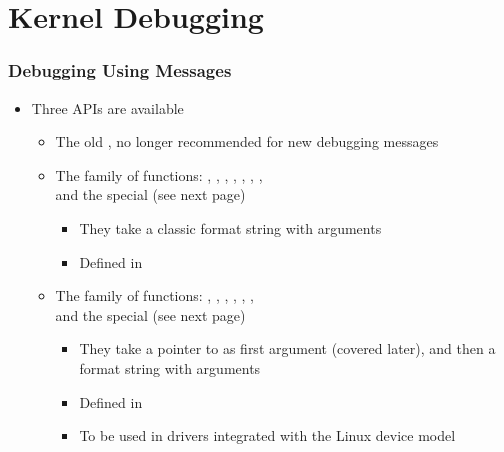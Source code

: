 \section{Kernel Debugging}

\begin{frame}
  \frametitle{Debugging Using Messages}
  \begin{itemize}
  \item Three APIs are available
    \begin{itemize}
    \item The old , no longer recommended for new debugging
      messages
    \item The  family of functions: ,
      , , ,
      , , ,
       \\
      and the special  (see next page)
      \begin{itemize}
      \item They take a classic format string with arguments
      \item Defined in 
      \end{itemize}
    \item The  family of functions: ,
      , , ,
      , ,  \\
      and the special  (see next page)
      \begin{itemize}
      \item They take a pointer to  as first
        argument (covered later), and then a format string with
        arguments
      \item Defined in 
      \item To be used in drivers integrated with the Linux device
        model
      \end{itemize}
    \end{itemize}
  \end{itemize}
\end{frame}

